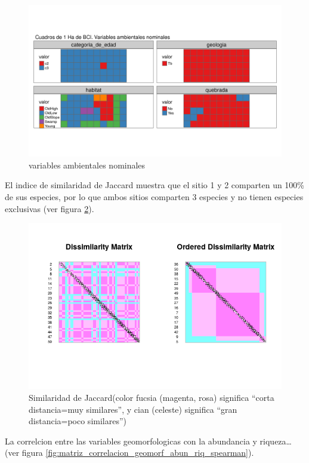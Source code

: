\documentclass[11pt,]{article}
\begin{document}
\begin{figure}
\centering
\includegraphics{mapas_variables_ambientales_nominales_tmap.png}
\caption{variables ambientales
nominales\label{fig:mapas_variables_ambientales_nominales}}
\end{figure}

El indice de similaridad de Jaccard muestra que el sitio 1 y 2 comparten
un 100\% de sus especies, por lo que ambos sitios comparten 3 especies y
no tienen especies exclusivas (ver figura
\ref{fig:similaridad_jaccard}).

\begin{figure}
\centering
\includegraphics{medicion_asociacion_jaccard.png}
\caption{Similaridad de Jaccard(color fucsia (magenta, rosa) significa
``corta distancia=muy similares'', y cian (celeste) significa ``gran
distancia=poco similares'')\label{fig:similaridad_jaccard}}
\end{figure}

La correlcion entre las variables geomorfologicas con la abundancia y
riqueza\ldots{}(ver figura
\ref{fig:matriz_correlacion_geomorf_abun_riq_spearman}).
\end{document}
